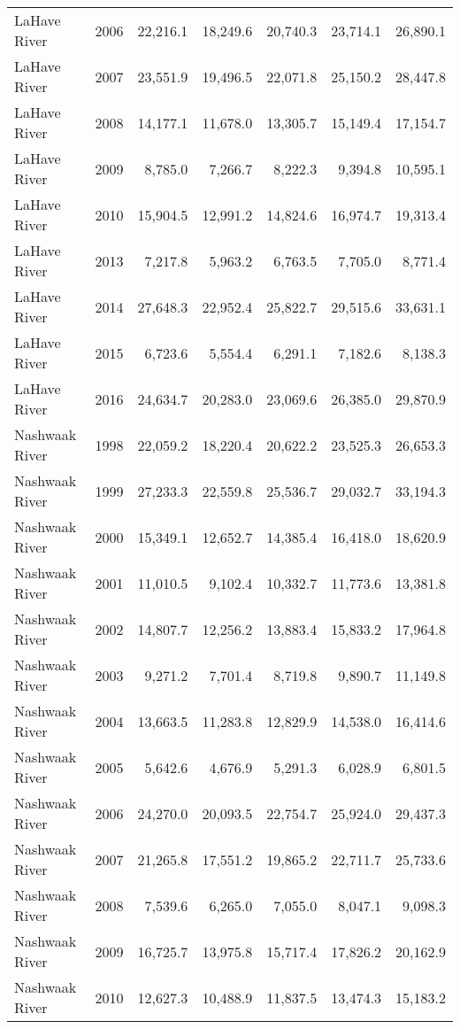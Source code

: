 \begin{longtable}{llrrrrr}
  LaHave River & 2006 & 22,216.1 & 18,249.6 & 20,740.3 & 23,714.1 & 26,890.1 \\ 
  LaHave River & 2007 & 23,551.9 & 19,496.5 & 22,071.8 & 25,150.2 & 28,447.8 \\ 
  LaHave River & 2008 & 14,177.1 & 11,678.0 & 13,305.7 & 15,149.4 & 17,154.7 \\ 
  LaHave River & 2009 & 8,785.0 & 7,266.7 & 8,222.3 & 9,394.8 & 10,595.1 \\ 
  LaHave River & 2010 & 15,904.5 & 12,991.2 & 14,824.6 & 16,974.7 & 19,313.4 \\ 
  LaHave River & 2013 & 7,217.8 & 5,963.2 & 6,763.5 & 7,705.0 & 8,771.4 \\ 
  LaHave River & 2014 & 27,648.3 & 22,952.4 & 25,822.7 & 29,515.6 & 33,631.1 \\ 
  LaHave River & 2015 & 6,723.6 & 5,554.4 & 6,291.1 & 7,182.6 & 8,138.3 \\ 
  LaHave River & 2016 & 24,634.7 & 20,283.0 & 23,069.6 & 26,385.0 & 29,870.9 \\ 
  Nashwaak River & 1998 & 22,059.2 & 18,220.4 & 20,622.2 & 23,525.3 & 26,653.3 \\ 
  Nashwaak River & 1999 & 27,233.3 & 22,559.8 & 25,536.7 & 29,032.7 & 33,194.3 \\ 
  Nashwaak River & 2000 & 15,349.1 & 12,652.7 & 14,385.4 & 16,418.0 & 18,620.9 \\ 
  Nashwaak River & 2001 & 11,010.5 & 9,102.4 & 10,332.7 & 11,773.6 & 13,381.8 \\ 
  Nashwaak River & 2002 & 14,807.7 & 12,256.2 & 13,883.4 & 15,833.2 & 17,964.8 \\ 
  Nashwaak River & 2003 & 9,271.2 & 7,701.4 & 8,719.8 & 9,890.7 & 11,149.8 \\ 
  Nashwaak River & 2004 & 13,663.5 & 11,283.8 & 12,829.9 & 14,538.0 & 16,414.6 \\ 
  Nashwaak River & 2005 & 5,642.6 & 4,676.9 & 5,291.3 & 6,028.9 & 6,801.5 \\ 
  Nashwaak River & 2006 & 24,270.0 & 20,093.5 & 22,754.7 & 25,924.0 & 29,437.3 \\ 
  Nashwaak River & 2007 & 21,265.8 & 17,551.2 & 19,865.2 & 22,711.7 & 25,733.6 \\ 
  Nashwaak River & 2008 & 7,539.6 & 6,265.0 & 7,055.0 & 8,047.1 & 9,098.3 \\ 
  Nashwaak River & 2009 & 16,725.7 & 13,975.8 & 15,717.4 & 17,826.2 & 20,162.9 \\ 
  Nashwaak River & 2010 & 12,627.3 & 10,488.9 & 11,837.5 & 13,474.3 & 15,183.2 \\ 

\end{longtable}
